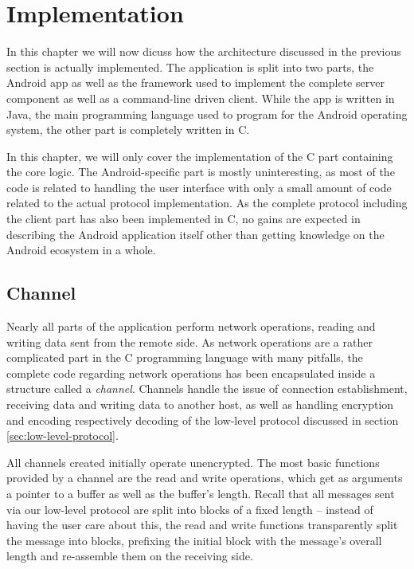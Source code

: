 \section{Implementation}

In this chapter we will now dicuss how the architecture discussed in the previous section is actually implemented.
The application is split into two parts, the Android app as well as the framework used to implement the complete server component as well as a command-line driven client.
While the app is written in Java, the main programming language used to program for the Android operating system, the other part is completely written in C.

In this chapter, we will only cover the implementation of the C part containing the core logic.
The Android-specific part is mostly uninteresting, as most of the code is related to handling the user interface with only a small amount of code related to the actual protocol implementation.
As the complete protocol including the client part has also been implemented in C, no gains are expected in describing the Android application itself other than getting knowledge on the Android ecosystem in a whole.

\subsection{Channel}
\label{sec:channel}

Nearly all parts of the application perform network operations, reading and writing data sent from the remote side.
As network operations are a rather complicated part in the C programming language with many pitfalls, the complete code regarding network operations has been encapsulated inside a structure called a \emph{channel}.
Channels handle the issue of connection establishment, receiving data and writing data to another host, as well as handling encryption and encoding respectively decoding of the low-level protocol discussed in section \ref{sec:low-level-protocol}.

All channels created initially operate unencrypted.
The most basic functions provided by a channel are the read and write operations, which get as arguments a pointer to a buffer as well as the buffer's length.
Recall that all messages sent via our low-level protocol are split into blocks of a fixed length -- instead of having the user care about this, the read and write functions transparently split the message into blocks, prefixing the initial block with the message's overall length and re-assemble them on the receiving side.

